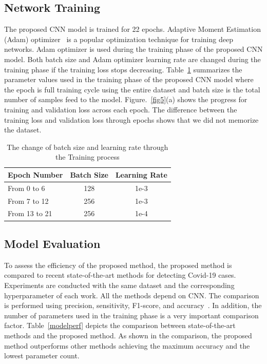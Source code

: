 \subsection{Network Training}
The proposed CNN model is trained for 22 epochs. Adaptive Moment Estimation (Adam) optimizer~\cite{kingma2014adam} is a popular optimization technique for training deep networks. Adam optimizer is used during the training phase of the proposed CNN model. Both batch size and Adam optimizer learning rate are changed during the training phase if the training loss stops decreasing. Table~\ref{tabTrparam} summarizes the parameter values used in the training phase of the proposed CNN model where the epoch is full training cycle using the entire dataset and batch size is the total number of samples feed to the model. Figure.~\ref{fig5}(a) shows the progress for training and validation loss across each epoch. The difference between the training loss and validation loss through epochs shows that we did not memorize the dataset.
\begin{table}[htbp]
\caption{The change of batch size and learning rate through the Training process}
\begin{center}

\begin{tabular}{|l|c|c|}
\hline
\textbf{Epoch Number} & \textbf{Batch Size} & \textbf{Learning Rate} \\
\hline
\hline
From 0 to 6 & 128 & 1e-3\\
\hline
From 7 to 12 & 256 & 1e-3\\
\hline
From 13 to 21 & 256 & 1e-4\\
\hline
 
\end{tabular}
\label{tabTrparam}
\end{center}
\end{table}



\subsection{Model Evaluation}

To assess the efficiency of the proposed method,  the proposed method is compared to recent state-of-the-art methods for detecting Covid-19 cases. Experiments are conducted with the same dataset and the corresponding hyperparameter of each work. All the methods depend on CNN. The comparison is performed using precision, sensitivity, F1-score, and accuracy~\cite{hossin2015review}. In addition, the number of parameters used in the training phase is a very important comparison factor. Table~\ref{modelperf} depicts the comparison between state-of-the-art methods and the proposed method. As shown in the comparison, the proposed method outperforms other methods achieving the maximum accuracy and the lowest parameter count. 



